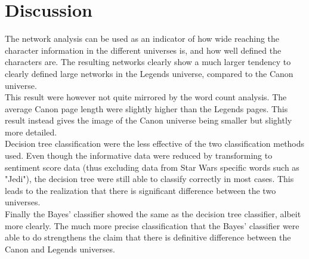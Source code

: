 \section{Discussion}
The network analysis can be used as an indicator of how wide reaching the character information in the different universes is, and how well defined the characters are. The resulting networks clearly show a much larger tendency to clearly defined large networks in the Legends universe, compared to the Canon universe.\\
This result were however not quite mirrored by the word count analysis. The average Canon page length were slightly higher than the Legends pages. This result instead gives the image of the Canon universe being smaller but slightly more detailed.\\
Decision tree classification were the less effective of the two classification methods used. Even though the informative data were reduced by transforming to sentiment score data (thus excluding data from Star Wars specific words such as "Jedi"), the decision tree were still able to classify correctly in most cases. This leads to the realization that there is significant difference between the two universes.\\
Finally the Bayes' classifier showed the same as the decision tree classifier, albeit more clearly. The much more precise classification that the Bayes' classifier were able to do strengthens the claim that there is definitive difference between the Canon and Legends universes.